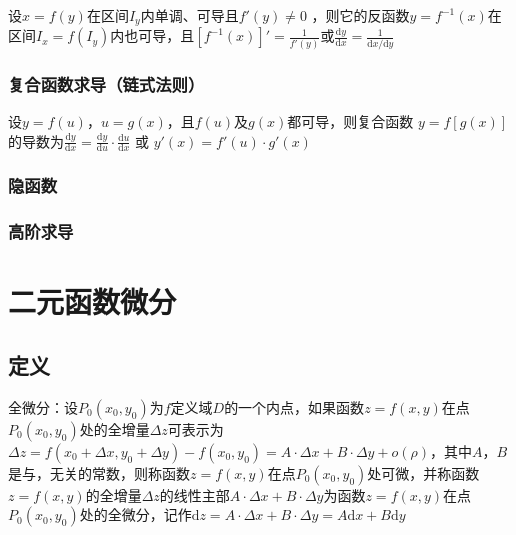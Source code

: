 \documentclass[12pt]{book}
\begin{document}
设$ x=f(y) $在区间$ I_y $内单调、可导且$ f'(y)\ne 0$ ，则它的反函数$ y=f^{-1}(x) $在区间$ I_x=f(I_y) $内也可导，且$ [f^{-1}(x)]'=\frac{1}{f'(y)} $或$ \frac{\mathrm{d}y}{\mathrm{d}{x}}=\frac{1}{\mathrm{d}x/\mathrm{d}y}$ 

\subsubsection{复合函数求导（链式法则）}

设$ y=f(u) $，$ u=g(x) $，且$ f(u) $及$ g(x) $都可导，则复合函数 $y=f[g(x)] $的导数为$ \frac{\mathrm{d}y}{\mathrm{d}x}=\frac{\mathrm{d}y}{\mathrm{d}u}\cdot \frac{\mathrm{d}u}{\mathrm{d}x} $ 或 $y'(x)=f'(u)\cdot g'(x) $

\subsubsection{隐函数}

\subsubsection{高阶求导}





\section{二元函数微分}


\subsection{定义}

全微分：设$ P_0(x_0,y_0) $为$ f $定义域$ D $的一个内点，如果函数$ z=f(x,y) $在点$ P_0(x_0,y_0) $处的全增量$ \Delta z $可表示为$ \Delta z=f(x_0+\Delta x,y_0+\Delta y)-f(x_0,y_0) =A\cdot \Delta{x}+B\cdot \Delta{y}+o(\rho) $，其中$A$，$B$是与，无关的常数，则称函数$ z=f(x,y) $在点$ P_0(x_0,y_0) $处可微，并称函数$ z=f(x,y) $的全增量$ \Delta z $的线性主部$ A\cdot \Delta{x}+B\cdot \Delta{y} $为函数$ z=f(x,y) $在点$ P_0(x_0,y_0) $处的全微分，记作$ \mathrm{d}z = A\cdot \Delta{x}+B\cdot \Delta{y}=A\mathrm{d}{x}+B\mathrm{d}{y} $
\end{document}
